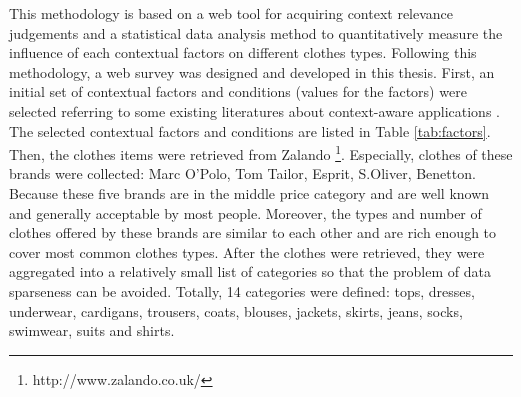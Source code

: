 This methodology is based on a web tool for acquiring context relevance judgements and a statistical data analysis method to quantitatively measure the influence of each contextual factors on different clothes types. Following this methodology, a web survey was designed and developed in this thesis. First, an initial set of contextual factors and conditions (values for the factors) were selected referring to some existing literatures about context-aware applications \cite{ref:5, ref:12, ref:19}. The selected contextual factors and conditions are listed in Table \ref{tab:factors}. Then, the clothes items were retrieved from Zalando \footnote{http://www.zalando.co.uk/}. Especially, clothes of these brands were collected: Marc O'Polo, Tom Tailor, Esprit, S.Oliver, Benetton. Because these five brands are in the middle price category and are well known and generally acceptable by most people. Moreover, the types and number of clothes offered by these brands are similar to each other and are rich enough to cover most common clothes types. After the clothes were retrieved, they were aggregated into a relatively small list of categories so that the problem of data sparseness can be avoided. Totally, 14 categories were defined: tops, dresses, underwear, cardigans, trousers, coats, blouses, jackets, skirts, jeans, socks, swimwear, suits and shirts.

